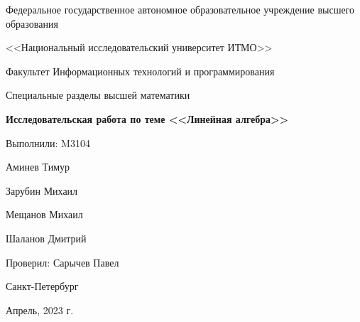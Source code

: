 \begin{titlepage}
  \begin{center}
    \Large
    Федеральное государственное автономное образовательное учреждение
    высшего образования

    <<Национальный исследовательский университет ИТМО>>

    \vspace{1cm}

    \Large
    Факультет Информационных технологий и программирования

    \vspace{1cm}
    Специальные разделы высшей математики

    \vspace{0.5cm}
    \LARGE
    \textbf{Исследовательская работа по теме
      <<Линейная алгебра>>
    }
  \end{center}

  \vspace{4cm}
  \vfill

  \begin{flushright}
    \Large
    Выполнили: M3104

    Аминев Тимур

    Зарубин Михаил

    Мещанов Михаил

    Шаланов Дмитрий


    Проверил: Сарычев Павел
  \end{flushright}

  \vfill

  \begin{center}
    \Large
    Санкт-Петербург

    Апрель, 2023 г.
  \end{center}
\end{titlepage}
